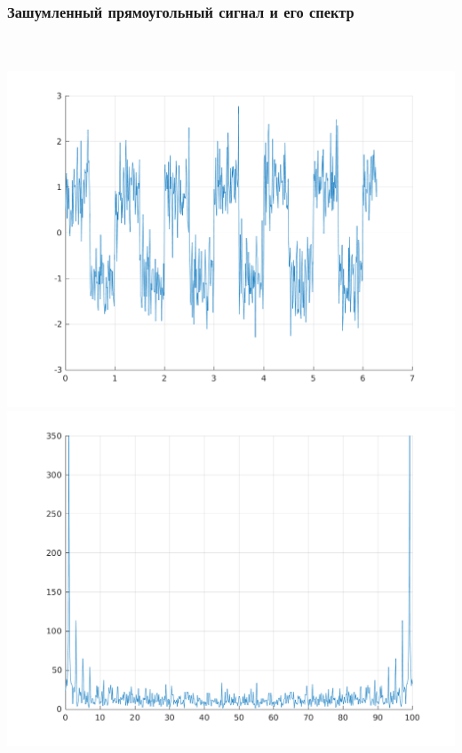 \documentclass[a4paper]{article}
\begin{document}
\subsubsection{Зашумленный прямоугольный сигнал и его спектр}\\
\newpage
\\
\includegraphics[scale=0.7]{lab3/figures/figure_8.png}\\
\includegraphics[scale=0.7]{lab3/figures/figure_9.png}\\
\end{document}
